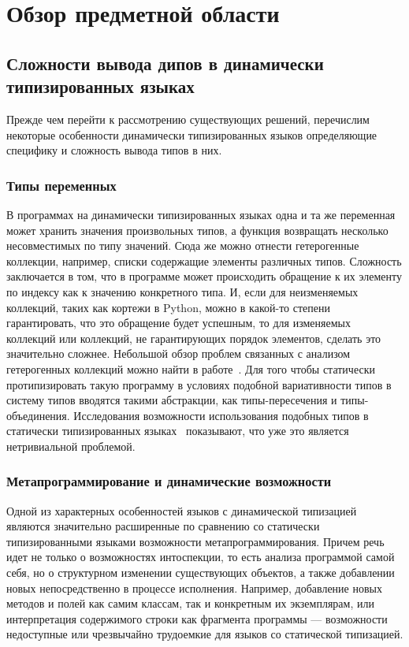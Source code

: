 \chapter{Обзор предметной области}

\section{Сложности вывода дипов в динамически типизированных языках}


Прежде чем перейти к рассмотрению существующих решений, перечислим некоторые
особенности динамически типизированных языков определяющие специфику и сложность
вывода типов в них.

\subsection{Типы переменных}

В программах на динамически типизированных языках одна и та же переменная может
хранить значения произвольных типов, а функция возвращать несколько
несовместимых по типу значений. Сюда же можно отнести гетерогенные коллекции,
например, списки содержащие элементы различных типов. Сложность заключается в
том, что в программе может происходить обращение к их элементу по индексу как к
значению конкретного типа. И, если для неизменяемых коллекций, таких как кортежи
в Python, можно в какой-то степени гарантировать, что это обращение будет
успешным, то для изменяемых коллекций или коллекций, не гарантирующих порядок
элементов, сделать это значительно сложнее. Небольшой обзор проблем связанных с
анализом гетерогенных коллекций можно найти в работе~\cite[]{Salib2004}. 
Для того чтобы статически протипизировать такую программу в условиях подобной
вариативности типов в систему типов вводятся такими абстракции, как
типы-пересечения и типы-объединения. Исследования возможности использования
подобных типов в статически типизированных
языках~\cite[]{Igarashi2006,Ortin2011:union}  показывают, что уже это является
нетривиальной проблемой.

\subsection{Метапрограммирование и динамические возможности}

Одной из характерных особенностей языков с динамической типизацией являются
значительно расширенные по сравнению со статически типизированными языками
возможности метапрограммирования. Причем речь идет не только о возможностях
интоспекции, то есть анализа программой самой себя, но о структурном изменении
существующих объектов, а также добавлении новых непосредственно в процессе
исполнения. Например, добавление новых методов и полей как самим классам, так и
конкретным их экземплярам, или интерпретация содержимого строки как фрагмента
программы --- возможности недоступные или чрезвычайно трудоемкие для языков со
статической типизацией.

